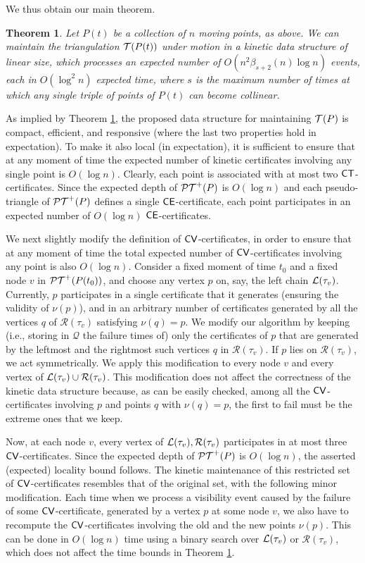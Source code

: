 \documentclass[11pt]{article}
\def\PT{{\cal PT}}
\def\CT{{\sf CT}}
\def\CV{{\sf CV}}
\def\CE{{\sf CE}}
\def\T{{\cal T}}
\def\Q{\mathcal{Q}}
\def\L{{\cal L}}
\def\R{\mathcal{R}}
\newtheorem{theorem}{Theorem}[section]
\begin{document}
We thus obtain our main theorem.
\begin{theorem}\label{MainTheorem}
Let $P(t)$ be a collection of $n$ moving points, as above. We can maintain the triangulation $\T(P(t))$ under motion in a kinetic data structure of linear size, which processes an expected number of $O(n^2\beta_{s+2}(n)\log n)$ events, each in $O(\log^2n)$ expected time, where $s$ is the maximum number of times at which any single triple of points of $P(t)$ can become collinear. 
\end{theorem}

\medskip
{} As implied by Theorem \ref{MainTheorem}, the proposed data structure for maintaining $\T(P)$ is compact, efficient, and responsive (where the last two properties hold in expectation). To make it also local (in expectation), it is sufficient to ensure that at any moment of time the expected number of kinetic certificates involving any single point is $O(\log n)$. Clearly, each point is associated with at most two $\CT$-certificates.
Since the expected depth of $\PT^+(P)$ is $O(\log n)$ and each pseudo-triangle of $\PT^+(P)$ defines a single $\CE$-certificate, each point participates in an expected number of $O(\log n)$ $\CE$-certificates.

We next slightly modify the definition of $\CV$-certificates, in order to ensure that at any moment of time the total expected number of $\CV$-certificates involving any point is also $O(\log n)$.
Consider a fixed moment of time $t_0$ and a fixed node $v$ in $\PT^+(P(t_0))$, and choose any vertex $p$ on, say, the left chain $\L(\tau_v)$.
Currently, $p$ participates in a single certificate that it generates (ensuring the validity of $\nu(p)$), and in an arbitrary number of certificates generated by all the vertices $q$ of $\R(\tau_v)$ satisfying $\nu(q)=p$.
We modify our algorithm by keeping (i.e., storing in $\Q$ the failure times of) only the certificates of $p$ that are generated by the leftmost and the rightmost such vertices $q$ in $\R(\tau_v)$. 
If $p$ lies on $\R(\tau_v)$, we act symmetrically. We apply this modification to every node $v$ and every vertex of $\L(\tau_v)\cup \R(\tau_v)$.
This modification does not affect the correctness of the kinetic data structure because, as can be easily checked, among all the $\CV$-certificates involving $p$ and points $q$ with $\nu(q)=p$, the first to fail must be the extreme ones that we keep.

Now, at each node $v$, every vertex of $\L(\tau_v),\R(\tau_v)$ participates in at most three $\CV$-certificates. Since the expected depth of $\PT^+(P)$ is $O(\log n)$, the asserted (expected) locality bound follows. The kinetic maintenance of this restricted set of $\CV$-certificates resembles that of the original set, with the following minor modification. Each time when we process a visibility event caused by the failure of some $\CV$-certificate, generated by a vertex $p$ at some node $v$, we also have to recompute the $\CV$-certificates involving the old and the new points $\nu(p)$. This can be done in $O(\log n)$ time using a binary search over $\L(\tau_v)$ or $\R(\tau_v)$, which does not affect the time bounds in Theorem \ref{MainTheorem}.
\end{document}

